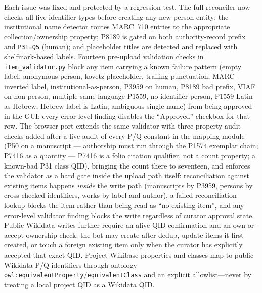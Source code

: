 \documentclass[Afour,sageh,times]{sagej}
\begin{document}
Each issue was fixed and protected by a regression test. The full reconciler now checks all five identifier types before creating any new person entity; the institutional name detector routes MARC~710 entries to the appropriate collection/ownership property; P8189 is gated on both authority-record prefix and \texttt{P31=Q5} (human); and placeholder titles are detected and replaced with shelfmark-based labels. Fourteen pre-upload validation checks in \texttt{item\_validator.py} block any item carrying a known failure pattern (empty label, anonymous person, kovetz placeholder, trailing punctuation, MARC-inverted label, institutional-as-person, P3959 on human, P8189 bad prefix, VIAF on non-person, multiple same-language P1559, no-identifier person, P1559 Latin-as-Hebrew, Hebrew label is Latin, ambiguous single name) from being approved in the GUI; every error-level finding disables the ``Approved'' checkbox for that row. The browser port extends the same validator with three property-audit checks added after a live audit of every P/Q constant in the mapping module (P50 on a manuscript --- authorship must run through the P1574 exemplar chain; P7416 as a quantity --- P7416 is a folio citation qualifier, not a count property; a known-bad P31 class QID), bringing the count there to seventeen, and enforces the validator as a hard gate inside the upload path itself: reconciliation against existing items happens \emph{inside} the write path (manuscripts by P3959, persons by cross-checked identifiers, works by label and author), a failed reconciliation lookup blocks the item rather than being read as ``no existing item'', and any error-level validator finding blocks the write regardless of curator approval state. Public Wikidata writes further require an alive-QID confirmation and an own-or-accept ownership check: the bot may create after dedup, update items it first created, or touch a foreign existing item only when the curator has explicitly accepted that exact QID. Project-Wikibase properties and classes map to public Wikidata P/Q identifiers through ontology \texttt{owl:equivalentProperty}/\texttt{equivalentClass} and an explicit allowlist---never by treating a local project QID as a Wikidata QID.
\end{document}
